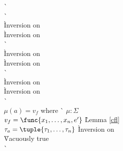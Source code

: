 \begin{description}
\begin{tabbing}
    \`  \\

    \`  \\
    \` Inversion on  \\
    \` Inversion on  \\
    \`  \\
    \` Inversion on  \\
    \` Inversion on  \\
    \`  \\
    \` Inversion on  \\
    \` Inversion on  \\
    \`  \\

  $\mu(a) = v_f$ where 
    \` $\mu : \Sigma$ \\
  $v_f = \func{x_1, \ldots, x_n, e'}$
    \` Lemma \ref{cfl} \\
  $\tau_a = \tuple{\tau_1, \ldots, \tau_n}$
    \` Inversion on  \\
    \` Vacuously true \\

    \`  \\
  \end{tabbing}


\end{description}
